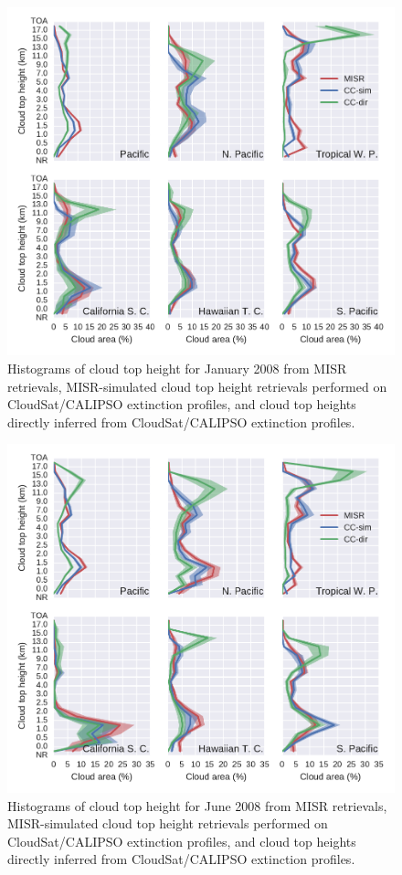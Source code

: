 \begin{figure}[tp]
\centering
\includegraphics{graphics/misr_cth_2008-01.pdf}
\caption{\label{fig:misr_cth_region_january}Histograms of cloud top
height for January 2008 from MISR retrievals, MISR-simulated cloud top
height retrievals performed on CloudSat/CALIPSO extinction profiles, and
cloud top heights directly inferred from CloudSat/CALIPSO extinction
profiles.}\label{fig:misrux5fcthux5fregionux5fjanuary}
\end{figure}

\begin{figure}[tp]
\centering
\includegraphics{graphics/misr_cth_2008-06.pdf}
\caption{\label{fig:misr_cth_region_june}Histograms of cloud top height
for June 2008 from MISR retrievals, MISR-simulated cloud top height
retrievals performed on CloudSat/CALIPSO extinction profiles, and cloud
top heights directly inferred from CloudSat/CALIPSO extinction
profiles.}\label{fig:misrux5fcthux5fregionux5fjune}
\end{figure}

